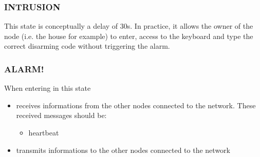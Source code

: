 \documentclass[10pt,a4paper]{article}
\theoremstyle{definition}%
\begin{document}
 \subsubsection{INTRUSION}
This state is conceptually a delay of 30s. In practice, it allows the owner of the node (i.e. the house for example) to enter, access to the keyboard and type the correct disarming code without triggering the alarm.

\subsubsection{ALARM!}
When entering in this state

\begin{itemize}
 \item{receives informations from the other nodes connected to the network. These received messages should be:}
  \begin{itemize}
	 \item{heartbeat}
	\end{itemize}
 \item{transmits informations to the other nodes connected to the network}
\end{itemize}
\end{document}
